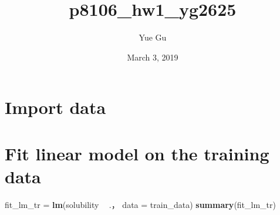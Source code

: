 \documentclass[]{article}
\title{p8106\_hw1\_yg2625}
\author{Yue Gu}
\date{March 3, 2019}
\newenvironment{Shaded}{\begin{snugshade}}{\end{snugshade}}
\newcommand{\KeywordTok}[1]{\textcolor[rgb]{0.13,0.29,0.53}{\textbf{#1}}}
\newcommand{\DataTypeTok}[1]{\textcolor[rgb]{0.13,0.29,0.53}{#1}}
\newcommand{\StringTok}[1]{\textcolor[rgb]{0.31,0.60,0.02}{#1}}
\newcommand{\OperatorTok}[1]{\textcolor[rgb]{0.81,0.36,0.00}{\textbf{#1}}}
\newcommand{\NormalTok}[1]{#1}
\begin{document}
\maketitle

\section{Import data}\label{import-data}

\begin{Shaded}
\end{Shaded}

\section{Fit linear model on the training
data}\label{fit-linear-model-on-the-training-data}

\begin{Shaded}
\begin{Highlighting}[]
\NormalTok{fit_lm_tr =}\StringTok{ }\KeywordTok{lm}\NormalTok{(solubility }\OperatorTok{~}\StringTok{ }\NormalTok{.， }\DataTypeTok{data =}\NormalTok{ train_data)}
\KeywordTok{summary}\NormalTok{(fit_lm_tr)}
\end{Highlighting}
\end{Shaded}
\end{document}
